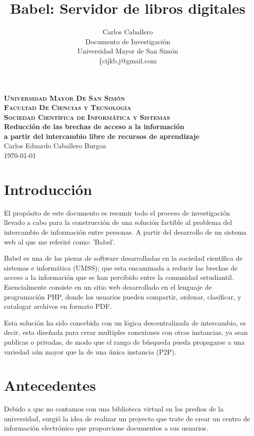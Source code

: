 \documentclass[letter,11pt,oneside,spanish]{article}
\title{\textbf{Babel: Servidor de libros digitales}}
\author{Carlos Caballero\\
Documento de Investigación\\
Universidad Mayor de San Simón\\
\{cijkb.j@gmail.com\\}
\date{}
\begin{document}
\begin{titlepage}
\thispagestyle{empty}
\begin{center}
\large{\textsc{\bf Universidad Mayor De San Simón}}\\
\large{\textsc{\bf Facultad De Ciencias y Tecnología}}\\
\large{\textsc{\bf Sociedad Científica de Informática y Sistemas}}\\
\vspace{4.0cm}
\large{\bf Reducción de las brechas de acceso a la información\\
a partir del intercambio libre de recursos de aprendizaje}\\
\vspace{1.0cm}
\small{Carlos Eduardo Caballero Burgoa}
~\\
\small{\today}
\end{center}
\end{titlepage}

\newpage
\tableofcontents

\newpage
\section{Introducción}
El propósito de este documento es resumir todo el proceso de investigación
llevado a cabo para la construcción de una solución factible al problema del
intercambio de información entre personas. A partir del desarrollo de un sistema
web al que me referiré como: 'Babel'.

Babel es una de las piezas de software desarrolladas en la sociedad científica
de sistemas e informática (UMSS); que esta encaminada a reducir las brechas de
acceso a la información que se han percibido entre la comunidad estudiantil.
Esencialmente consiste en un sitio web desarrollado en el lenguaje de
programación PHP, donde los usuarios pueden compartir, ordenar, clasificar, y
catalogar archivos en formato PDF.

Esta solución ha sido concebida con un lógica descentralizada de intercambio, es
decir, esta diseñada para crear multiples conexiones con otras instancias, ya
sean publicas o privadas, de modo que el rango de búsqueda pueda propagarse a
una variedad aún mayor que la de una única instancia (P2P).

\section{Antecedentes}
Debido a que no contamos con una biblioteca virtual en los predios de la
universidad, surgió la idea de realizar un proyecto que trate de crear un centro
de información electrónico que proporcione documentos a sus usuarios.
\end{document}
